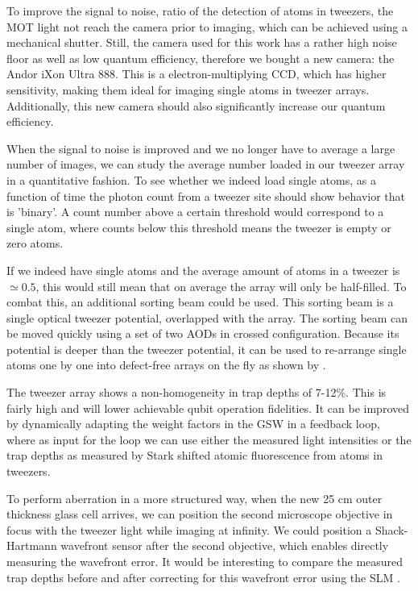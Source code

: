 \noindent To improve the signal to noise, ratio of the detection of atoms in tweezers, the MOT light not reach the camera prior to imaging, which can be achieved using a mechanical shutter. 
Still, the camera used for this work has a rather high noise floor as well as low quantum efficiency, therefore we bought a new camera: the Andor iXon Ultra 888.
This is a electron-multiplying \ac{CCD}, which has higher sensitivity, making them ideal for imaging single atoms in tweezer arrays.
Additionally, this new camera should also significantly increase our quantum efficiency.
    
When the signal to noise is improved and we no longer have to average a large number of images, we can study the average number loaded in our tweezer array in a quantitative fashion.
To see whether we indeed load single atoms, as a function of time the photon count from a tweezer site should show behavior that is 'binary'. A count number above a certain threshold would correspond to a single atom, where counts below this threshold means the tweezer is empty or zero atoms. 
    
If we indeed have single atoms and the average amount of atoms in a tweezer is $\simeq 0.5$, this would still mean that on average the array will only be half-filled.
To combat this, an additional sorting beam could be used. 
This sorting beam is a single optical tweezer potential, overlapped with the array. 
The sorting beam can be moved quickly using a set of two \ac{AOD}s in crossed configuration.
Because its potential is deeper than the tweezer potential, it can be used to re-arrange single atoms one by one into defect-free arrays on the fly as shown by \cite{Barredo2016}.

The tweezer array shows a non-homogeneity in trap depths of 7-12\%. This is fairly high and will lower achievable qubit operation fidelities.
It can be improved by dynamically adapting the weight factors in the \ac{GSW} in a feedback loop, where as input for the loop we can use either the measured light intensities or the trap depths as measured by Stark shifted atomic fluorescence from atoms in tweezers.

To perform aberration in a more structured way, when the new 25 cm outer thickness glass cell arrives, we can position the second microscope objective in focus with the tweezer light while imaging at infinity. 
We could position a Shack-Hartmann wavefront sensor after the second objective, which enables directly measuring the wavefront error.
It would be interesting to compare the measured trap depths before and after correcting for this wavefront error using the SLM \cite{Labuhn2016}.

